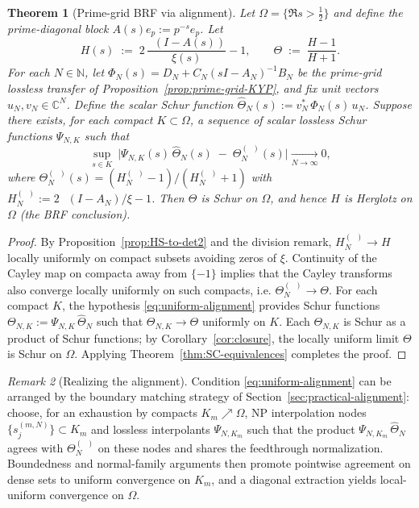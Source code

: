 \documentclass[11pt]{article}
\newtheorem{theorem}{Theorem}
\theoremstyle{definition}
\theoremstyle{remark}
\newtheorem{remark}[theorem]{Remark}
\newcommand{\C}{\mathbb{C}}
\newcommand{\N}{\mathbb{N}}
\DeclareMathOperator{\dettwo}{det_2}
\begin{document}
\begin{theorem}[Prime-grid BRF via alignment]\label{thm:prime-grid-BRF}
Let \(\Omega=\{\Re s>\tfrac12\}\) and define the prime-diagonal block \(A(s)e_p:=p^{-s}e_p\). Let
\[
 H(s)\;:=\;2\,\frac{\dettwo(I-A(s))}{\xi(s)}-1,\qquad \Theta\;:=\;\frac{H-1}{H+1}.
\]
For each \(N\in\N\), let \(\Phi_N(s)=D_N+C_N(sI-A_N)^{-1}B_N\) be the prime-grid lossless transfer of Proposition~\ref{prop:prime-grid-KYP}, and fix unit vectors \(u_N,v_N\in\C^N\). Define the scalar Schur function \(\widehat\Theta_N(s):=v_N^*\,\Phi_N(s)\,u_N\). Suppose there exists, for each compact \(K\subset\Omega\), a sequence of scalar lossless Schur functions \(\Psi_{N,K}\) such that
\begin{equation}\label{eq:uniform-alignment}
 \sup_{s\in K}\ \big|\Psi_{N,K}(s)\,\widehat\Theta_N(s)\; -\; \Theta_N^{(\dettwo)}(s)\big|\xrightarrow[N\to\infty]{}0,
\end{equation}
where \(\Theta_N^{(\dettwo)}(s)=(H_N^{(\dettwo)}-1)/(H_N^{(\dettwo)}+1)\) with \(H_N^{(\dettwo)}:=2\,\dettwo(I-A_N)/\xi-1\). Then \(\Theta\) is Schur on \(\Omega\), and hence \(H\) is Herglotz on \(\Omega\) (the BRF conclusion).
\end{theorem}
\begin{proof}
By Proposition~\ref{prop:HS-to-det2} and the division remark, \(H_N^{(\dettwo)}\to H\) locally uniformly on compact subsets avoiding zeros of \(\xi\). Continuity of the Cayley map on compacta away from \(\{-1\}\) implies that the Cayley transforms also converge locally uniformly on such compacts, i.e. \(\Theta_N^{(\dettwo)}\to\Theta\). For each compact \(K\), the hypothesis \eqref{eq:uniform-alignment} provides Schur functions \(\Theta_{N,K}:=\Psi_{N,K}\,\widehat\Theta_N\) such that \(\Theta_{N,K}\to\Theta\) uniformly on \(K\). Each \(\Theta_{N,K}\) is Schur as a product of Schur functions; by Corollary~\ref{cor:closure}, the locally uniform limit \(\Theta\) is Schur on \(\Omega\). Applying Theorem~\ref{thm:SC-equivalences} completes the proof.
\end{proof}
\begin{remark}[Realizing the alignment]
Condition \eqref{eq:uniform-alignment} can be arranged by the boundary matching strategy of Section~\ref{sec:practical-alignment}: choose, for an exhaustion by compacts \(K_m\nearrow\Omega\), NP interpolation nodes \(\{s_{j}^{(m,N)}\}\subset K_m\) and lossless interpolants \(\Psi_{N,K_m}\) such that the product \(\Psi_{N,K_m}\,\widehat\Theta_N\) agrees with \(\Theta_N^{(\dettwo)}\) on these nodes and shares the feedthrough normalization. Boundedness and normal-family arguments then promote pointwise agreement on dense sets to uniform convergence on \(K_m\), and a diagonal extraction yields local-uniform convergence on \(\Omega\).
\end{remark}
\end{document}
